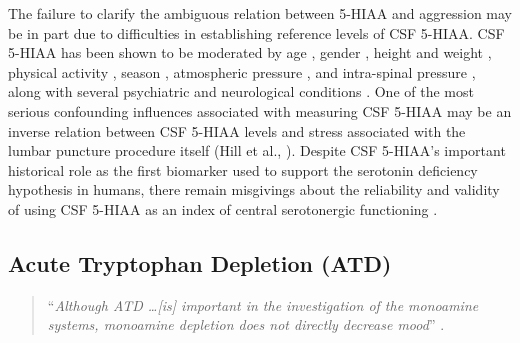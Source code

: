The failure to clarify the ambiguous relation between 5-HIAA and aggression may be in part due to difficulties in establishing reference levels of CSF 5-HIAA. CSF 5-HIAA has been shown to be moderated by age \parencite[e.g.,][]{Hedner1986, Seifert1980, Takeuchi2000}, gender \parencite[e.g.,][]{Blennow1993, Hagenfeldt1984}, height and weight \parencite[e.g.,][]{Blennow1993, Hartikainen1991, Stroembom1996}, physical activity \parencite{Eklundh2001, Nordin1996}, season \parencite[e.g.,][]{Brewerton1988, Hartikainen1991}, atmospheric pressure \parencite{Eklundh1994, Nordin1992}, and intra-spinal pressure \parencite{Eklundh2001a}, along with several psychiatric and neurological conditions \parencite[for a review of CSF 5-HIAA moderators see][]{Dhondt04}. One of the most serious confounding influences associated with measuring CSF 5-HIAA may be an inverse relation between CSF 5-HIAA levels and stress associated with the lumbar puncture procedure itself (Hill et al., \citeyear{Hill1999}). 
Despite CSF 5-HIAA's important historical role as the first biomarker used to support the serotonin deficiency hypothesis in humans, there remain misgivings about the reliability and validity of using CSF 5-HIAA as an index of central serotonergic functioning \parencite[e.g.,][]{Balaban1996, Hyland2008, Vegt2003}.



\subsection{Acute Tryptophan Depletion (ATD)}  
\begin{quotation}\noindent 
``\emph{Although ATD \ldots [is] important in the investigation of the monoamine systems, monoamine depletion does not directly decrease mood}'' \parencite{Ruhe2007}.\end{quotation}



